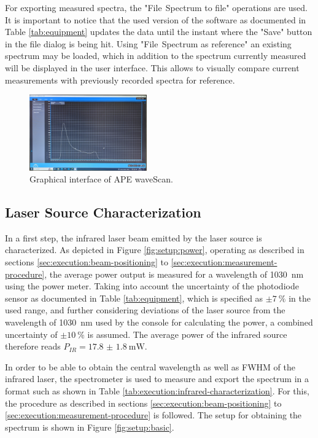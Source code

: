 For exporting measured spectra, the "File$~$\textrightarrow$~$Spectrum to file" operations are used. It is important to notice that the used version of the software as documented in Table \ref{tab:equipment} updates the data until the instant where the "Save" button in the file dialog is being hit. Using "File$~$\textrightarrow$~$Spectrum as reference" an existing spectrum may be loaded, which in addition to the spectrum currently measured will be displayed in the user interface. This allows to visually compare current measurements with previously recorded spectra for reference.

\begin{figure}[H]
    \centering
    \includegraphics[width=0.45\textwidth]{graphics/wave-scan.jpg}
    \caption{Graphical interface of APE waveScan.}
    \label{fig:execution:wave-scan}
\end{figure}

\subsection{Laser Source Characterization}
\label{sec:execution:infrared-characterization}

In a first step, the infrared laser beam emitted by the laser source is characterized. As depicted in Figure \ref{fig:setup:power}, operating as described in sections \ref{sec:execution:beam-positioning} to \ref{sec:execution:measurement-procedure}, the average power output is measured for a wavelength of \SI{1030}{\nm} using the power meter. Taking into account the uncertainty of the photodiode sensor as documented in Table \ref{tab:equipment}, which is specified as $\pm \SI{7}{\percent}$ in the used range, and further considering deviations of the laser source from the wavelength of \SI{1030}{\nm} used by the console for calculating the power, a combined uncertainty of $\pm \SI{10}{\percent}$ is assumed. The average power of the infrared source therefore reads $P_{IR} = \SI{17.8(18)}{\mW}$.

In order to be able to obtain the central wavelength as well as FWHM of the infrared laser, the spectrometer is used to measure and export the spectrum in a format such as shown in Table \ref{tab:execution:infrared-characterization}. For this, the procedure as described in sections \ref{sec:execution:beam-positioning} to \ref{sec:execution:measurement-procedure} is followed. The setup for obtaining the spectrum is shown in Figure \ref{fig:setup:basic}.


